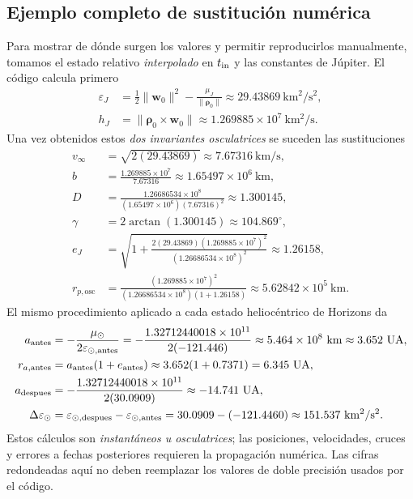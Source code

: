 \documentclass[11pt,a4paper]{article}
\newcommand{\vect}[1]{\bm{#1}}
\newcommand{\muS}{\mu_\odot}
\newcommand{\muJ}{\mu_{J}}
\begin{document}
\subsection{Ejemplo completo de sustitución numérica}
Para mostrar de dónde surgen los valores y permitir reproducirlos manualmente, tomamos el estado relativo \emph{interpolado} en $t_{\rm in}$ y las constantes de Júpiter. El código calcula primero
\begin{align*}
\varepsilon_J &=\frac12\lVert\vect w_0\rVert^2-\frac{\muJ}{\lVert\vect\rho_0\rVert}
 \approx29.43869\ \mathrm{km^2/s^2},\\
h_J&=\lVert\vect\rho_0\times\vect w_0\rVert
 \approx1.269885\times10^7\ \mathrm{km^2/s}.
\end{align*}
Una vez obtenidos estos \emph{dos invariantes osculatrices} se suceden las sustituciones
\begin{align*}
v_\infty&=\sqrt{2(29.43869)}\approx7.67316\ \mathrm{km/s},\\
b&=\frac{1.269885\times10^7}{7.67316}
 \approx1.65497\times10^6\ \mathrm{km},\\
D&=\frac{1.26686534\times10^8}{(1.65497\times10^6)(7.67316)^2}
 \approx1.300145,\\
\gamma&=2\arctan(1.300145)\approx104.869^\circ,\\
e_J&=\sqrt{1+\frac{2(29.43869)(1.269885\times10^7)^2}
 {(1.26686534\times10^8)^2}}\approx1.26158,\\
r_{p,\mathrm{osc}}&=\frac{(1.269885\times10^7)^2}{
(1.26686534\times10^8)(1+1.26158)}\approx5.62842\times10^5\ \mathrm{km}.
\end{align*}
El mismo procedimiento aplicado a cada estado heliocéntrico de Horizons da
\begin{align*}
 a_{\rm antes}&=-\frac{\muS}{2\varepsilon_{\odot,\rm antes}}
 =-\frac{1.32712440018\times10^{11}}{2(-121.446)}
 \approx 5.464\times10^8\ \mathrm{km}\approx3.652\ \mathrm{UA},\\
 r_{a,\rm antes}&=a_{\rm antes}(1+e_{\rm antes})
 \approx3.652(1+0.7371)=6.345\ \mathrm{UA},\\
 a_{\rm despues}&=-\frac{1.32712440018\times10^{11}}{2(30.0909)}
 \approx-14.741\ \mathrm{UA},\\
 \Delta\varepsilon_\odot&=\varepsilon_{\odot,\rm despues}-
 \varepsilon_{\odot,\rm antes}
 =30.0909-(-121.4460)\approx151.537\ \mathrm{km^2/s^2}.
\end{align*}
Estos cálculos son \emph{instantáneos u osculatrices}; las posiciones, velocidades, cruces y errores a fechas posteriores requieren la propagación numérica. Las cifras redondeadas aquí no deben reemplazar los valores de doble precisión usados por el código.
\end{document}
